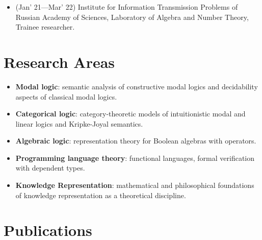 \documentclass[11pt,a4paper]{article}
\begin{document}
\begin{itemize}[leftmargin=*]
    \begin{itemize}[leftmargin=*]
    \item (2018) Cardano, a cryptocurrency backend in Haskell.
    \item (2018) Ariadne, an R\&D project, a cryptocurrency wallet.
    \item (2018) Snowdrop, an R\&D project, a framework for blockchain systems with a proof-of-stake consensus.
    \item (2019) Machine Learning in Haskell, an R\&D project on type-safe matrix operations via singletons. The work on that project also included the preparation of blogposts and the conference talk.
    \item (2019) Formality, an R\&D project, a dependently typed language with affine types.
    \item (2020--2022) Glasgow Haskell Compiler contribution: the implementation of the Char Kind and partial implementation of @-binders in function declarations.
    \end{itemize}
    \item (Jan' 21---Mar' 22) Institute for Information Transmission Problems of Russian Academy of Sciences, Laboratory of Algebra and Number Theory, Trainee researcher.
\end{itemize}

\section{Research Areas}

\begin{itemize}[leftmargin=*]
    \item \textbf{Modal logic}: semantic analysis of constructive modal logics and decidability aspects of classical modal logics.
    \item \textbf{Categorical logic}: category-theoretic models of intuitionistic modal and linear logics and Kripke-Joyal semantics.
    \item \textbf{Algebraic logic}: representation theory for Boolean algebras with operators.
    \item \textbf{Programming language theory}: functional languages, formal verification with dependent types.
    \item \textbf{Knowledge Representation}: mathematical and philosophical foundations of knowledge representation as a theoretical discipline.
\end{itemize}

\section{Publications}
\end{document}
